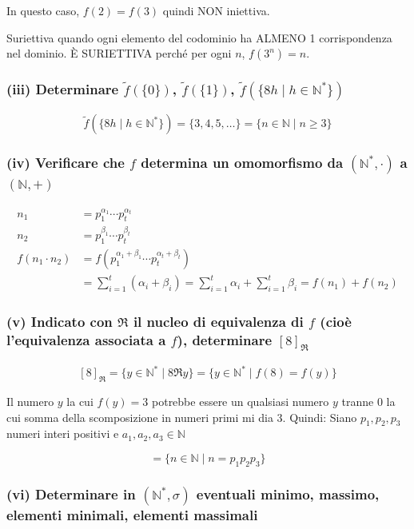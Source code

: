 In questo caso, $f(2) = f(3)$ quindi NON iniettiva.

Suriettiva quando ogni elemento del codominio ha ALMENO 1 corrispondenza nel dominio. È SURIETTIVA perché per ogni $n$, $f(3^n) = n$.

\subsubsection*{(iii) Determinare $\tilde{f}(\{0\})$, $\tilde{f}(\{1\})$, $\tilde{f}(\{8h \mid h \in \mathbb{N}^*\})$}

$$\tilde{f}(\{8h \mid h \in \mathbb{N}^*\}) = \{3, 4, 5, \ldots\} = \{n \in \mathbb{N} \mid n \geq 3\}$$

\subsubsection*{(iv) Verificare che $f$ determina un omomorfismo da $(\mathbb{N}^*, \cdot)$ a $(\mathbb{N}, +)$}

\begin{align*}
n_1 &= p_1^{\alpha_1} \cdots p_t^{\alpha_t} \\
n_2 &= p_1^{\beta_1} \cdots p_t^{\beta_t} \\
f(n_1 \cdot n_2) &= f(p_1^{\alpha_1 + \beta_1} \cdots p_t^{\alpha_t + \beta_t}) \\
&= \sum_{i=1}^{t} (\alpha_i + \beta_i) = \sum_{i=1}^{t} \alpha_i + \sum_{i=1}^{t} \beta_i = f(n_1) + f(n_2)
\end{align*}


\subsubsection*{(v) Indicato con $\Re$ il nucleo di equivalenza di $f$ (cioè l'equivalenza associata a $f$), determinare $[8]_\Re$}

$$[8]_{\Re} = \{y \in \mathbb{N}^* \mid 8 \Re y\} = \{y \in \mathbb{N}^* \mid f(8) = f(y)\}$$

Il numero $y$ la cui $f(y) = 3$ potrebbe essere un qualsiasi numero $y$ tranne 0 la cui somma della scomposizione in numeri primi mi dia 3. Quindi:
Siano $p_1, p_2, p_3$ numeri interi positivi e $a_1, a_2, a_3 \in \mathbb{N}$

$$= \{n \in \mathbb{N} \mid n = p_1 p_2 p_3\}$$

\subsubsection*{(vi) Determinare in $(\mathbb{N}^*, \sigma)$ eventuali minimo, massimo, elementi minimali, elementi massimali}

